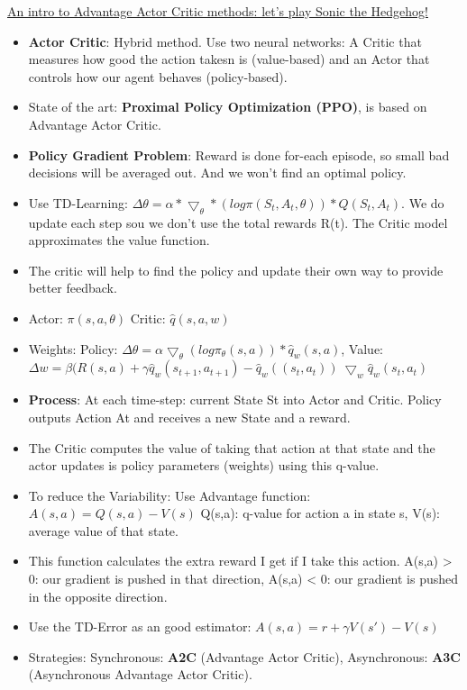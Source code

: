 \href{https://www.freecodecamp.org/news/an-intro-to-advantage-actor-critic-methods-lets-play-sonic-the-hedgehog-86d6240171d/}{An intro to Advantage Actor Critic methods: let’s play Sonic the Hedgehog!}
\begin{itemize}[noitemsep,nolistsep]
	\item \textbf{Actor Critic}: Hybrid method. Use two neural networks: A Critic that measures how good the action takesn is (value-based) and an Actor that controls how our agent behaves (policy-based).
	\item State of the art: \textbf{Proximal Policy Optimization (PPO)}, is based on Advantage Actor Critic.
	\item \textbf{Policy Gradient Problem}: Reward is done for-each episode, so small bad decisions will be averaged out. And we won't find an optimal policy.
	\item Use TD-Learning: $\Delta \theta = \alpha * \bigtriangledown_\theta * (log \pi(S_t,A_t,\theta)) * Q(S_t,A_t)$. We do update each step sou we don't use the total rewards R(t). The Critic model approximates the value function.
	\item The critic will help to find the policy and update their own way to provide better feedback.
	\item Actor: $\pi(s,a,\theta)$  Critic: $\hat{q}(s,a,w)$
	\item Weights: Policy: $\Delta \theta = \alpha \bigtriangledown_\theta(log \pi_\theta(s,a)) * \hat{q}_w(s,a)$, Value: $\Delta w = \beta (R(s,a) + \gamma \hat{q}_w(s_{t+1},a_{t+1}) - \hat{q}_w((s_t,a_t))\ \bigtriangledown_w \hat{q}_w(s_t,a_t)$
	\item \textbf{Process}: At each time-step: current State St into Actor and Critic. Policy outputs Action At and receives a new State and a reward.
	\item The Critic computes the value of taking that action at that state and the actor updates is policy parameters (weights) using this q-value.
	\item To reduce the Variability: Use Advantage function: $A(s,a) = Q(s,a) - V(s)$ Q(s,a): q-value for action a in state s, V(s): average value of that state.
	\item This function calculates the extra reward I get if I take this action. A(s,a) > 0:  our gradient is pushed in that direction, A(s,a) < 0: our gradient is pushed in the opposite direction.
	\item Use the TD-Error as an good estimator: $A(s,a) = r + \gamma V(s') - V(s)$
	\item Strategies: Synchronous: \textbf{A2C} (Advantage Actor Critic), Asynchronous: \textbf{A3C} (Asynchronous Advantage Actor Critic).

\end{itemize}

